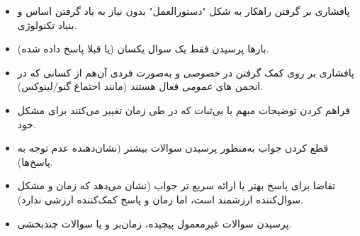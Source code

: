 \begin{itemize}
\item
پافشاری بر گرفتن راهکار به شکل "دستورالعمل" بدون نیاز
به یاد گرفتن اساس و بنیاد تکنولوژی.

\item
بارها پرسیدن فقط یک سوال یکسان (یا قبلا پاسخ داده شده).

\item
پافشاری بر روی کمک گرفتن در {\itshape خصوصی} و به‌صورت فردی
آن‌هم از کسانی که در انجمن های {\itshape عمومی} فعال هستند
(مانند احتماع گنو/لینوکس).

\item
فراهم کردن توضیحات مبهم یا بی‌ثبات که در طی زمان تغییر می‌کنند
برای مشکل خود.

\item
قطع کردن جواب به‌منظور پرسیدن سوالات بیشتر
(نشان‌دهنده عدم توجه به پاسخ‌ها).

\item
تقاضا برای پاسخ بهتر یا ارائه سریع تر جواب (نشان می‌دهد
که زمان و مشکل سوال‌کننده ارزشمند است، اما زمان و پاسخ
کمک‌کننده ارزشی ندارد).

\item
پرسیدن سوالات غیرمعمول پیچیده، زمان‌بر و یا سوالات چندبخشی.
\end{itemize}


